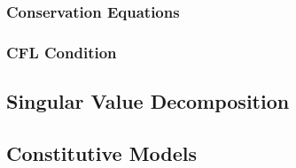\documentclass[m,times]{cgMA}
\begin{document}
\cite{MIT:CONTINUUM_MECHANICS}
\cite{MPM:COURSE}
\subsubsection{Conservation Equations}
\cite{MPM:APIC}
\subsubsection{CFL Condition}
\subsection{Singular Value Decomposition}
\cite{SVD:3x3}
\subsection{Constitutive Models}
\cite{MPM:DRUCKER} %
\cite{MPM:MULTI} %
\cite{MPM:INVERT} %
\cite{MPM:OLROYDB} %
\cite{MPM:SHELLS} %
\cite{MPM:PHASE_CHANGE} %
\cite{MPM:OPTIMI_INTEGR} %
\end{document}
